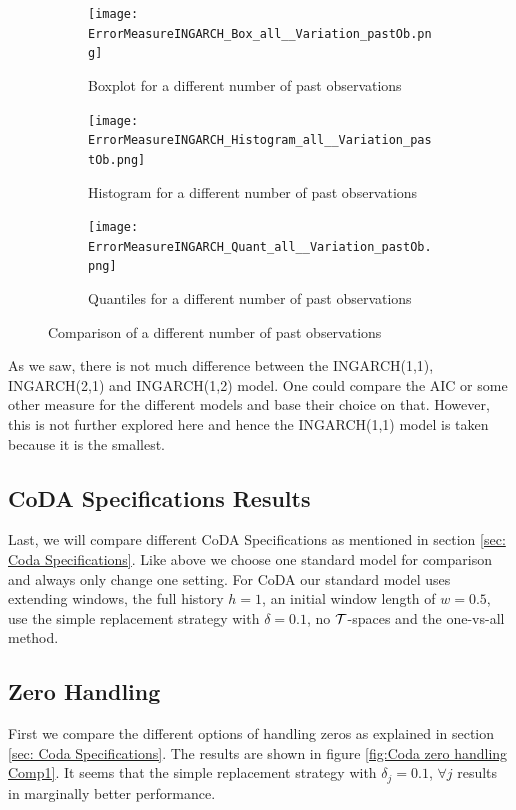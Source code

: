 \begin{figure}[htb!]
\centering
\begin{subfigure}[b]{0.45\textwidth}
\texttt{[image: ErrorMeasureINGARCH\_Box\_all\_\_Variation\_pastOb.png]}
\caption{Boxplot for a different number of past observations}
\label{fig:past obs Box}
\end{subfigure}
\hfill
\begin{subfigure}[b]{0.45\textwidth}
\texttt{[image: ErrorMeasureINGARCH\_Histogram\_all\_\_Variation\_pastOb.png]}
\caption{Histogram for a different number of past observations}
\label{fig:past obs Hist}
\end{subfigure}
\hfill
\begin{subfigure}[b]{0.8\textwidth}
\texttt{[image: ErrorMeasureINGARCH\_Quant\_all\_\_Variation\_pastOb.png]}
\caption{Quantiles for a different number of past observations}
\label{fig:past obs Quant}
\end{subfigure}
\caption{Comparison of a different number of past observations}
\label{fig:past obs Comp1}
\end{figure}

As we saw, there is not much difference between the INGARCH(1,1), INGARCH(2,1) and INGARCH(1,2) model. One could compare the AIC or some other measure for the different models and base their choice on that. However, this is not further explored here and hence the INGARCH(1,1) model is taken because it is the smallest.

\subsection{CoDA Specifications Results}
\label{sec: CoDA Specifications Results}

Last, we will compare different CoDA Specifications as mentioned in section \ref{sec: Coda Specifications}. Like above we choose one standard model for comparison and always only change one setting. For CoDA our standard model uses extending windows, the full history $h=1$, an initial window length of $w=0.5$, use the simple replacement strategy with $\delta=0.1$, no $\mathcal{T}$-spaces and the one-vs-all method. 

\subsection{Zero Handling}
\label{sec: Zero Handling}

First we compare the different options of handling zeros as explained in section \ref{sec: Coda Specifications}. The results are shown in figure \ref{fig:Coda zero handling Comp1}. It seems that the simple replacement strategy with $\delta_j = 0.1$, $\forall j$ results in marginally better performance.

